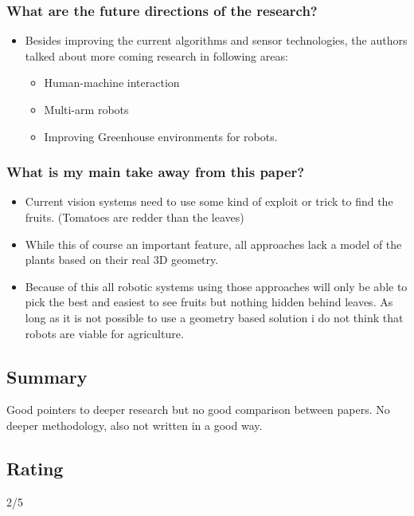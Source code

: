     \subsubsection*{What are the future directions of the research?}
    \begin{itemize}
        \item Besides improving the current algorithms and sensor technologies, the authors talked about more coming research in following areas: \begin{itemize}
            \item Human-machine interaction
            \item Multi-arm robots
            \item Improving Greenhouse environments for robots.
        \end{itemize}
    \end{itemize}
    
    \subsubsection*{What is my main take away from this paper?}
    \begin{itemize}
        \item Current vision systems need to use some kind of exploit or trick to find the fruits. (Tomatoes are redder than the leaves) 
        \item While this of course an important feature, all approaches lack a model of the plants based on their real 3D geometry. 
        \item Because of this all robotic systems using those approaches will only be able to pick the best and easiest to see fruits but nothing hidden behind leaves. As long as it is not possible to use a geometry based solution i do not think that robots are viable for agriculture.
    \end{itemize}
    
    \subsection*{Summary}
    Good pointers to deeper research but no good comparison between papers. No deeper methodology, also not written in a good way.
    \subsection*{Rating}
    2/5
    
    \newpage
    
